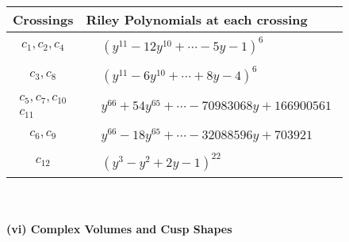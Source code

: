 \documentclass[1p]{elsarticle_modified}
\theoremstyle{definition}
\begin{document}
\begin{tabular}{m{50pt}|m{274pt}}
Crossings & \hspace{64pt}Riley Polynomials at each crossing \\
\hline $$\begin{aligned}c_{1},c_{2},c_{4}\end{aligned}$$&$\begin{aligned}
&(y^{11}-12 y^{10}+\cdots-5 y-1)^{6}
\end{aligned}$\\
\hline $$\begin{aligned}c_{3},c_{8}\end{aligned}$$&$\begin{aligned}
&(y^{11}-6 y^{10}+\cdots+8 y-4)^{6}
\end{aligned}$\\
\hline $$\begin{aligned}c_{5},c_{7},c_{10}\\c_{11}\end{aligned}$$&$\begin{aligned}
&y^{66}+54 y^{65}+\cdots-70983068 y+166900561
\end{aligned}$\\
\hline $$\begin{aligned}c_{6},c_{9}\end{aligned}$$&$\begin{aligned}
&y^{66}-18 y^{65}+\cdots-32088596 y+703921
\end{aligned}$\\
\hline $$\begin{aligned}c_{12}\end{aligned}$$&$\begin{aligned}
&(y^3- y^2+2 y-1)^{22}
\end{aligned}$\\
\hline
\end{tabular}\\~\\
\newpage\flushleft \textbf{(vi) Complex Volumes and Cusp Shapes}
\end{document}
